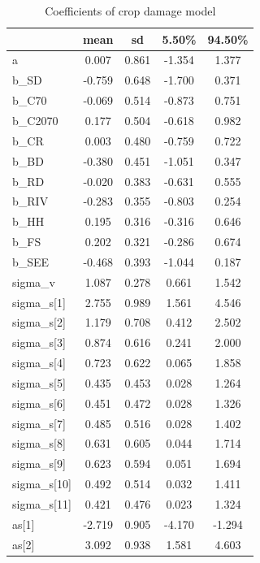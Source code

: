 \documentclass[12pt,]{article}
\begin{document}
\begin{table}[]
\centering
\footnotesize
\caption{Coefficients of crop damage model}
\begin{tabular}{lcccc}
                 & mean   & sd    & 5.50\% & 94.50\% \\ \hline
a                & 0.007  & 0.861 & -1.354 & 1.377   \\
b\_SD            & -0.759 & 0.648 & -1.700 & 0.371   \\
b\_C70           & -0.069 & 0.514 & -0.873 & 0.751   \\
b\_C2070         & 0.177  & 0.504 & -0.618 & 0.982   \\
b\_CR            & 0.003  & 0.480 & -0.759 & 0.722   \\
b\_BD            & -0.380 & 0.451 & -1.051 & 0.347   \\
b\_RD            & -0.020 & 0.383 & -0.631 & 0.555   \\
b\_RIV           & -0.283 & 0.355 & -0.803 & 0.254   \\
b\_HH            & 0.195  & 0.316 & -0.316 & 0.646   \\
b\_FS            & 0.202  & 0.321 & -0.286 & 0.674   \\
b\_SEE           & -0.468 & 0.393 & -1.044 & 0.187   \\
sigma\_v         & 1.087  & 0.278 & 0.661  & 1.542   \\
sigma\_s{[}1{]}  & 2.755  & 0.989 & 1.561  & 4.546   \\
sigma\_s{[}2{]}  & 1.179  & 0.708 & 0.412  & 2.502   \\
sigma\_s{[}3{]}  & 0.874  & 0.616 & 0.241  & 2.000   \\
sigma\_s{[}4{]}  & 0.723  & 0.622 & 0.065  & 1.858   \\
sigma\_s{[}5{]}  & 0.435  & 0.453 & 0.028  & 1.264   \\
sigma\_s{[}6{]}  & 0.451  & 0.472 & 0.028  & 1.326   \\
sigma\_s{[}7{]}  & 0.485  & 0.516 & 0.028  & 1.402   \\
sigma\_s{[}8{]}  & 0.631  & 0.605 & 0.044  & 1.714   \\
sigma\_s{[}9{]}  & 0.623  & 0.594 & 0.051  & 1.694   \\
sigma\_s{[}10{]} & 0.492  & 0.514 & 0.032  & 1.411   \\
sigma\_s{[}11{]} & 0.421  & 0.476 & 0.023  & 1.324   \\
as{[}1{]}        & -2.719 & 0.905 & -4.170 & -1.294  \\
as{[}2{]}        & 3.092  & 0.938 & 1.581  & 4.603   \\

\end{tabular}
\end{table}
\end{document}
